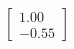 \documentclass[preview]{standalone}
\begin{document}
\begin{align*}
\begin{bmatrix} 1.00 \\ -0.55 \end{bmatrix}
\end{align*}
\end{document}
